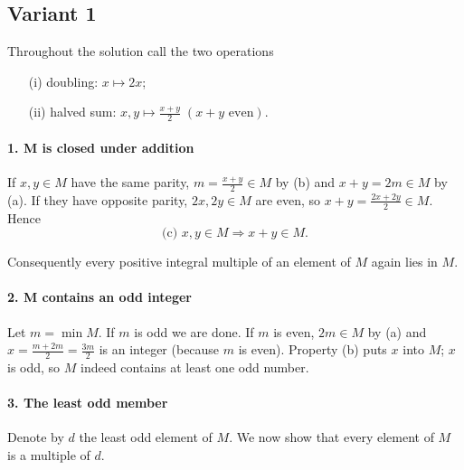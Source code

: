 \documentclass[12pt,a4paper]{article}
\theoremstyle{definition}
\begin{document}
\subsection{Variant 1}
Throughout the solution call the two operations
\begin{enumerate}
\item[(i)] doubling: $x \mapsto 2x$;
\item[(ii)] halved sum: $x,y \mapsto \frac{x+y}{2}\; (x+y \text{ even})$.
\end{enumerate}

\paragraph{1. M is closed under addition}
If $x,y \in M$ have the same parity, $m = \frac{x+y}{2} \in M$ by (b) and $x+y = 2m \in M$ by (a).
If they have opposite parity, $2x,2y \in M$ are even, so
$x+y = \frac{2x+2y}{2} \in M$.
Hence
\begin{equation}
\text{(c) } x,y \in M \Longrightarrow x+y \in M.
\end{equation}

Consequently every positive integral multiple of an element of $M$ again lies in $M$.

\paragraph{2. M contains an odd integer}
Let $m = \min M$. If $m$ is odd we are done.
If $m$ is even, $2m \in M$ by (a) and $x = \frac{m+2m}{2} = \frac{3m}{2}$ is an integer (because $m$ is even).
Property (b) puts $x$ into $M$; $x$ is odd, so $M$ indeed contains at least one odd number.

\paragraph{3. The least odd member}
Denote by $d$ the least odd element of $M$. We now show that every element of $M$ is a multiple of $d$.
\end{document}
